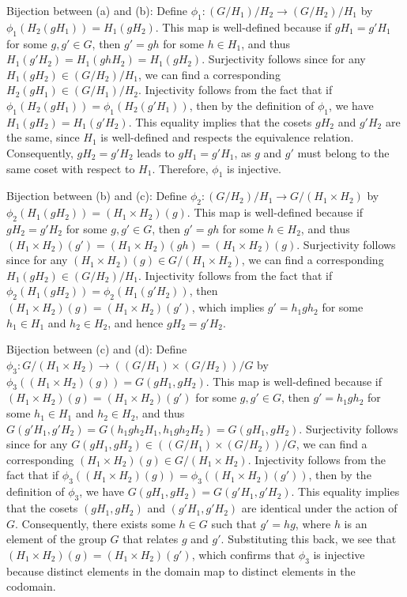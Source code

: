 \documentclass{article}
\begin{document}
Bijection between (a) and (b):
Define $\phi_1 : (G/H_1)/H_2 \to (G/H_2)/H_1$ by $\phi_1(H_2(gH_1)) = H_1(gH_2)$. This map is well-defined because if $gH_1 = g'H_1$ for some $g, g' \in G$, then $g' = gh$ for some $h \in H_1$, and thus $H_1(g'H_2) = H_1(ghH_2) = H_1(gH_2)$. Surjectivity follows since for any $H_1(gH_2) \in (G/H_2)/H_1$, we can find a corresponding $H_2(gH_1) \in (G/H_1)/H_2$. Injectivity follows from the fact that if $\phi_1(H_2(gH_1)) = \phi_1(H_2(g'H_1))$, then by the definition of $\phi_1$, we have $H_1(gH_2) = H_1(g'H_2)$. This equality implies that the cosets $gH_2$ and $g'H_2$ are the same, since $H_1$ is well-defined and respects the equivalence relation. Consequently, $gH_2 = g'H_2$ leads to $gH_1 = g'H_1$, as $g$ and $g'$ must belong to the same coset with respect to $H_1$. Therefore, $\phi_1$ is injective.

Bijection between (b) and (c):
Define $\phi_2 : (G/H_2)/H_1 \to G/(H_1 \times H_2)$ by $\phi_2(H_1(gH_2)) = (H_1 \times H_2)(g)$. This map is well-defined because if $gH_2 = g'H_2$ for some $g, g' \in G$, then $g' = gh$ for some $h \in H_2$, and thus $(H_1 \times H_2)(g') = (H_1 \times H_2)(gh) = (H_1 \times H_2)(g)$. Surjectivity follows since for any $(H_1 \times H_2)(g) \in G/(H_1 \times H_2)$, we can find a corresponding $H_1(gH_2) \in (G/H_2)/H_1$. Injectivity follows from the fact that if $\phi_2(H_1(gH_2)) = \phi_2(H_1(g'H_2))$, then $(H_1 \times H_2)(g) = (H_1 \times H_2)(g')$, which implies $g' = h_1 g h_2$ for some $h_1 \in H_1$ and $h_2 \in H_2$, and hence $gH_2 = g'H_2$.

Bijection between (c) and (d):
Define $\phi_3 : G/(H_1 \times H_2) \to ((G/H_1) \times (G/H_2))/G$ by $\phi_3((H_1 \times H_2)(g)) = G(gH_1, gH_2)$. This map is well-defined because if $(H_1 \times H_2)(g) = (H_1 \times H_2)(g')$ for some $g, g' \in G$, then $g' = h_1 g h_2$ for some $h_1 \in H_1$ and $h_2 \in H_2$, and thus $G(g'H_1, g'H_2) = G(h_1 g h_2 H_1, h_1 g h_2 H_2) = G(gH_1, gH_2)$. Surjectivity follows since for any $G(gH_1, gH_2) \in ((G/H_1) \times (G/H_2))/G$, we can find a corresponding $(H_1 \times H_2)(g) \in G/(H_1 \times H_2)$. Injectivity follows from the fact that if $\phi_3((H_1 \times H_2)(g)) = \phi_3((H_1 \times H_2)(g'))$, then by the definition of $\phi_3$, we have $G(gH_1, gH_2) = G(g'H_1, g'H_2)$. This equality implies that the cosets $(gH_1, gH_2)$ and $(g'H_1, g'H_2)$ are identical under the action of $G$. Consequently, there exists some $h \in G$ such that $g' = hg$, where $h$ is an element of the group $G$ that relates $g$ and $g'$. Substituting this back, we see that $(H_1 \times H_2)(g) = (H_1 \times H_2)(g')$, which confirms that $\phi_3$ is injective because distinct elements in the domain map to distinct elements in the codomain.
\end{document}
